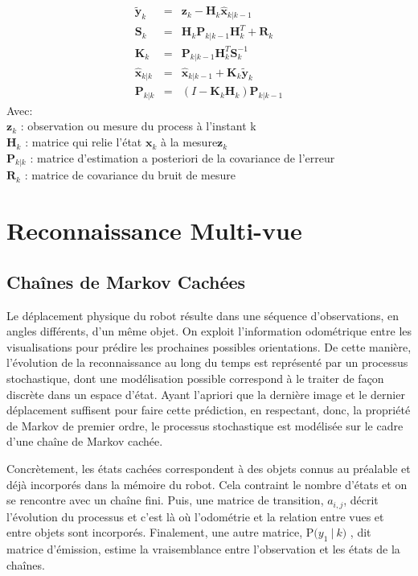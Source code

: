 \begin{equation*}
	\begin{array}{ccl}
		\tilde{\textbf{y}}_{k} &=& \textbf{z}_{k} - \textbf{H}_{k}\hat{\textbf{x}}_{k|k-1} \\
		\textbf{S}_{k} &=& \textbf{H}_{k}\textbf{P}_{k|k-1} \textbf{H}_{k}^{T}+\textbf{R}_{k} \\
		\textbf{K}_{k} &=& \textbf{P}_{k|k-1}\textbf{H}_{k}^{T}\textbf{S}_{k}^{-1} \\
		\hat{\textbf{x}}_{k|k} &=& \hat{\textbf{x}}_{k|k-1} + \textbf{K}_{k}\tilde{\textbf{y}}_{k} \\
		\textbf{P}_{k|k} &=& (I - \textbf{K}_{k} \textbf{H}_{k}) \textbf{P}_{k|k-1}
	\end{array}
\end{equation*}
\noindent Avec: \\
$\textbf{z}_{k}$ : observation ou mesure du process à l'instant k \\
$\textbf{H}_{k}$ : matrice qui relie l'état $\textbf{x}_{k}$ à la mesure$ \textbf{z}_{k}$\\
$\textbf{P}_{k|k}$ : matrice d'estimation a posteriori de la covariance de l'erreur\\
$\textbf{R}_{k}$ : matrice de covariance du bruit de mesure

\section {Reconnaissance Multi-vue}

\subsection {Chaînes de Markov Cachées}

Le déplacement physique du robot résulte dans une séquence
d'observations, en angles différents, d'un même objet. On exploit
l'information odométrique entre les visualisations pour prédire les
prochaines possibles orientations. De cette manière, l'évolution de la
reconnaissance au long du temps est représenté par un processus
stochastique, dont une modélisation possible correspond à le traiter
de façon discrète dans un espace d'état. Ayant l'apriori que la
dernière image et le dernier déplacement suffisent pour faire cette
prédiction, en respectant, donc, la propriété de Markov de premier
ordre, le processus stochastique est modélisée sur le cadre d'une
chaîne de Markov cachée.

Concrètement, les états cachées correspondent à des objets connus au
préalable et déjà incorporés dans la mémoire du robot. Cela contraint le
nombre d'états et on se rencontre avec un chaîne fini. Puis, une
matrice de transition, $a_{i,j}$, décrit l'évolution du processus et c'est là où
l'odométrie et la relation entre vues et entre objets sont
incorporés. Finalement, une autre matrice, $\mathrm{P}\big( y_1 \ | \ k \big)$
, dit matrice d'émission, estime la vraisemblance entre l'observation
et les états de la chaînes.

